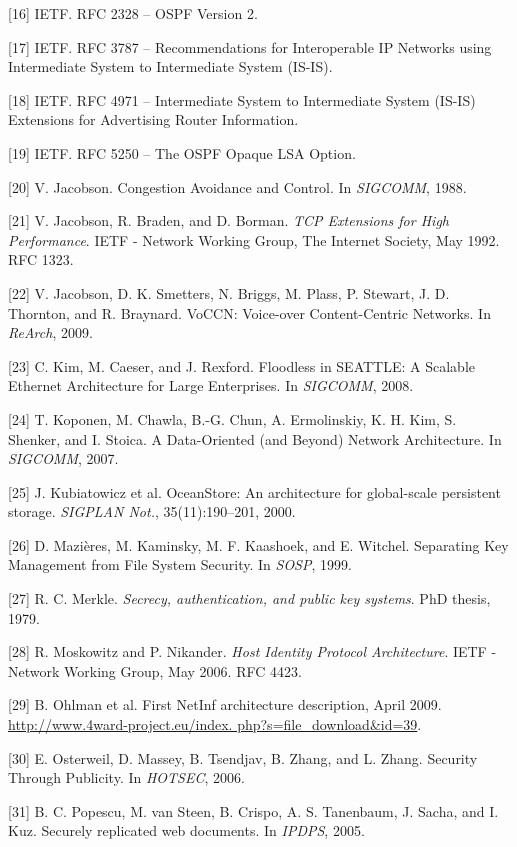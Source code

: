 [16] IETF. RFC 2328 – OSPF Version 2.

[17] IETF. RFC 3787 – Recommendations for Interoperable IP
Networks using Intermediate System to Intermediate System (IS-IS).

[18] IETF. RFC 4971 – Intermediate System to Intermediate System (IS-IS) Extensions for Advertising Router Information.

[19] IETF. RFC 5250 – The OSPF Opaque LSA Option.

[20] V. Jacobson. Congestion Avoidance and Control. In
\emph{SIGCOMM}, 1988.

[21] V. Jacobson, R. Braden, and D. Borman. \emph{TCP Extensions for
High Performance}. IETF - Network Working Group, The
Internet Society, May 1992. RFC 1323.

[22] V. Jacobson, D. K. Smetters, N. Briggs, M. Plass, P. Stewart,
J. D. Thornton, and R. Braynard. VoCCN: Voice-over
Content-Centric Networks. In \emph{ReArch}, 2009.

[23] C. Kim, M. Caeser, and J. Rexford. Floodless in SEATTLE:
A Scalable Ethernet Architecture for Large Enterprises. In
\emph{SIGCOMM}, 2008.

[24] T. Koponen, M. Chawla, B.-G. Chun, A. Ermolinskiy, K. H.
Kim, S. Shenker, and I. Stoica. A Data-Oriented (and
Beyond) Network Architecture. In \emph{SIGCOMM}, 2007.

[25] J. Kubiatowicz et al. OceanStore: An architecture for
global-scale persistent storage. \emph{SIGPLAN Not.},
35(11):190–201, 2000.

[26] D. Mazières, M. Kaminsky, M. F. Kaashoek, and E. Witchel.
Separating Key Management from File System Security. In
\emph{SOSP}, 1999.

[27] R. C. Merkle. \emph{Secrecy, authentication, and public key
systems}. PhD thesis, 1979.

[28] R. Moskowitz and P. Nikander. \emph{Host Identity Protocol
Architecture}. IETF - Network Working Group, May 2006.
RFC 4423.

[29] B. Ohlman et al. First NetInf architecture description, April
2009. \url{http://www.4ward-project.eu/index.
php?s=file_download&id=39}.

[30] E. Osterweil, D. Massey, B. Tsendjav, B. Zhang, and
L. Zhang. Security Through Publicity. In \emph{HOTSEC}, 2006.

[31] B. C. Popescu, M. van Steen, B. Crispo, A. S. Tanenbaum,
J. Sacha, and I. Kuz. Securely replicated web documents. In
\emph{IPDPS}, 2005.

